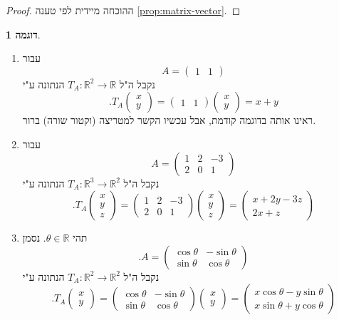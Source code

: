 \documentclass[12pt]{report}
\theoremstyle{plain}
\theoremstyle{definition}
\newtheorem{example}{דוגמה}[chapter]
\newcommand{\R}{\mathbb{R}}
\newcommand{\0}{\mathbf{0}}
\begin{document}
\begin{proof}
ההוכחה מיידית לפי טענה
\ref{prop:matrix-vector}.
\end{proof}

\begin{example}\label{ex:rotation}\
\begin{enumerate}[label=\alph*.]
\item 
עבור
$$
A=\begin{pmatrix}
1 & 1 
\end{pmatrix}
$$
נקבל ה"ל 
$T_A:\R^2\to \R$
הנתונה ע"י
$$
.T_A\begin{pmatrix}x\\y\end{pmatrix}=\begin{pmatrix}
1 & 1 
\end{pmatrix}\begin{pmatrix}x\\y\end{pmatrix}=x+y
$$
ראינו אותה בדוגמה קודמת, אבל עכשיו הקשר למטריצה (וקטור שורה) ברור.

\item 
עבור
$$
A=\begin{pmatrix}
1 & 2 & -3 \\
2 & 0 & 1
\end{pmatrix}
$$
נקבל ה"ל 
$T_A:\R^3\to \R^2$
הנתונה ע"י
$$
.T_A\begin{pmatrix}x\\y\\z\end{pmatrix}=\begin{pmatrix}
1 & 2 & -3 \\
2 & 0 & 1
\end{pmatrix}\begin{pmatrix}x\\y\\z\end{pmatrix}=\begin{pmatrix}
x+2y-3z \\
2x+z
\end{pmatrix}
$$


\item
תהי
$\theta\in\R$.
נסמן
$$
.A=\begin{pmatrix}
\cos{\theta} & -\sin{\theta} \\
\sin{\theta} & \cos{\theta} 
\end{pmatrix}
$$
נקבל ה"ל 
$T_A:\R^2\to \R^2$
הנתונה ע"י
$$
.T_A\begin{pmatrix}x\\y\end{pmatrix}=\begin{pmatrix}
\cos{\theta} & -\sin{\theta} \\
\sin{\theta} & \cos{\theta} 
\end{pmatrix}\begin{pmatrix}x\\y\end{pmatrix}=\begin{pmatrix}
x\cos{\theta}-y\sin{\theta} \\
x\sin{\theta}+y\cos{\theta}
\end{pmatrix}
$$


\end{enumerate}
\end{example}
\end{document}

